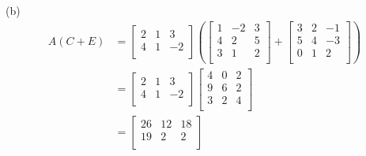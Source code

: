 \documentclass{article}
\begin{document}
(b)
\begin{align*}
    A(C+E) &= 
    \begin{bmatrix}
        2 & 1 & 3\\
        4 & 1 & -2\\
    \end{bmatrix}
    \left(
        \begin{bmatrix}
            1 & -2 & 3\\
            4 & 2 & 5\\
            3 & 1 & 2\\
        \end{bmatrix}
        + 
        \begin{bmatrix}
            3 & 2 & -1\\
            5 & 4 & -3\\
            0 & 1 & 2\\
        \end{bmatrix}
    \right)\\
    &= 
    \begin{bmatrix}
        2 & 1 & 3\\
        4 & 1 & -2\\
    \end{bmatrix}
    \begin{bmatrix}
        4 & 0 & 2\\
        9 & 6 & 2\\
        3 & 2 & 4\\
    \end{bmatrix}\\
    &=
    \begin{bmatrix}
        26 & 12 & 18\\
        19 & 2 & 2\\
    \end{bmatrix}
\end{align*}
\end{document}
